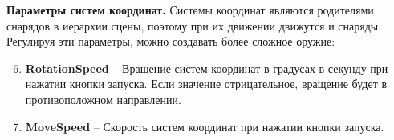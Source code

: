 \vspace{5mm}

\textbf{Параметры систем координат.} Системы координат являются родителями снарядов в иерархии сцены, поэтому при их движении движутся и снаряды. Регулируя эти параметры, можно создавать более сложное оружие:
\begin{enumerate}
    \setcounter{enumi}{5}
    \item {\small \textbf{RotationSpeed}} -- Вращение систем координат в градусах в секунду при нажатии кнопки запуска. Если значение отрицательное, вращение будет в противоположном направлении.
    \item {\small \textbf{MoveSpeed}} -- Скорость систем координат при нажатии кнопки запуска.
\end{enumerate}

\vspace{5mm}


